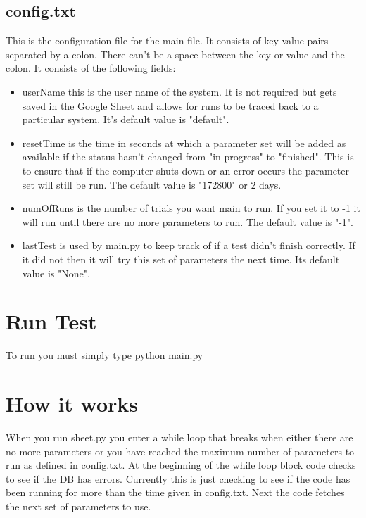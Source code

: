 \documentclass[12pt]{article}
\begin{document}
\subsection{config.txt}
This is the configuration file for the main file.  It consists of key value pairs separated by a colon.  There can't be a space between the key or value and the colon.  It consists of the following fields:
\begin{itemize}
	\item userName this is the user name of the system.  It is not required but gets saved in the Google Sheet and allows for runs to be traced back to a particular system.  It's default value is "default".
	\item resetTime is the time in seconds at which a parameter set will be added as available if the status hasn't changed from "in progress" to "finished".  This is to ensure that if the computer shuts down or an error occurs the parameter set will still be run.  The default value is "172800" or 2 days.
	\item numOfRuns is the number of trials you want main to run.  If you set it to -1 it will run until there are no more parameters to run.  The default value is "-1".
	\item lastTest is used by main.py to keep track of if a test didn't finish correctly.  If it did not then it will try this set of parameters the next time.  Its default value is "None".
\end{itemize}

\section{Run Test}
To run you must simply type python main.py

\section{How it works}
When you run sheet.py you enter a while loop that breaks when either there are no more parameters or you have reached the maximum number of parameters to run as defined in config.txt.  At the beginning of the while loop block code checks to see if the DB has errors.  Currently this is just checking to see if the code has been running for more than the time given in config.txt.  Next the code fetches the next set of parameters to use.  
\end{document}
